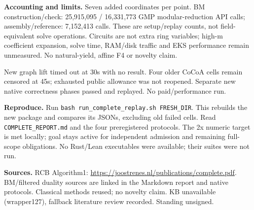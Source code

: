 \documentclass[10pt]{article}
\begin{document}
\textbf{Accounting and limits.} Seven added coordinates per point.
BM construction/check: 25,915,095 / 16,331,773 GMP modular-reduction API calls;
assembly/reference: 7,152,413 calls. These are setup/replay counts, not
field-equivalent solve operations. Circuits are not extra ring variables;
high-m coefficient expansion, solve time, RAM/disk traffic and EKS performance
remain unmeasured. No natural-yield, affine F4 or novelty claim.

New graph lift timed out at 30s with no result. Four older CoCoA cells remain
censored at 45s; exhausted public allowance was not reopened. Separate new
native correctness phases passed and replayed. No paid/performance run.

\textbf{Reproduce.} Run \texttt{bash run\_complete\_replay.sh FRESH\_DIR}.
This rebuilds the new package and compares its JSONs, excluding old failed
cells. Read \texttt{COMPLETE\_REPORT.md} and the four preregistered protocols.
The 2x numeric target is met locally; goal stays active for independent
admission and remaining full-scope obligations. No Rust/Lean executables
were available; their suites were not run.

\textbf{Sources.} RCB Algorithm1:
\url{https://joostrenes.nl/publications/complete.pdf}.
BM/filtered duality sources are linked in the Markdown report and native
protocols. Classical methods reused; no novelty claim. KB unavailable
(wrapper127), fallback literature review recorded. Standing unsigned.
\end{document}
